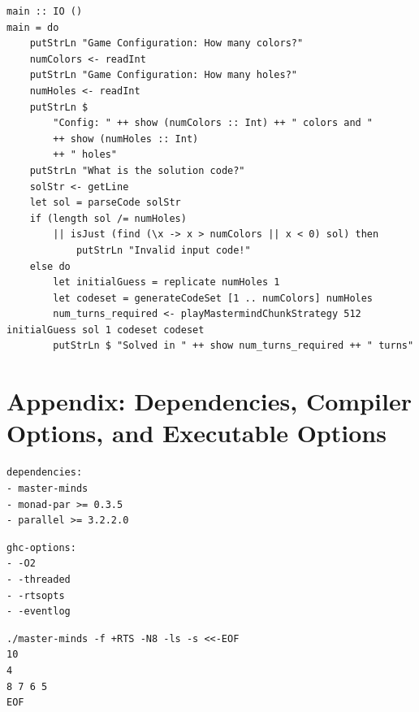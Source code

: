 \documentclass{article}
\begin{document}
\begin{verbatim}
main :: IO ()
main = do
    putStrLn "Game Configuration: How many colors?"
    numColors <- readInt
    putStrLn "Game Configuration: How many holes?"
    numHoles <- readInt
    putStrLn $
        "Config: " ++ show (numColors :: Int) ++ " colors and "
        ++ show (numHoles :: Int)
        ++ " holes"
    putStrLn "What is the solution code?"
    solStr <- getLine
    let sol = parseCode solStr
    if (length sol /= numHoles)
        || isJust (find (\x -> x > numColors || x < 0) sol) then 
            putStrLn "Invalid input code!"
    else do
        let initialGuess = replicate numHoles 1 
        let codeset = generateCodeSet [1 .. numColors] numHoles
        num_turns_required <- playMastermindChunkStrategy 512 initialGuess sol 1 codeset codeset
        putStrLn $ "Solved in " ++ show num_turns_required ++ " turns"
\end{verbatim}

\section{Appendix: Dependencies, Compiler Options, and Executable Options}
\begin{verbatim}
dependencies: 
- master-minds
- monad-par >= 0.3.5
- parallel >= 3.2.2.0
\end{verbatim}

\begin{verbatim}
ghc-options:
- -O2
- -threaded
- -rtsopts
- -eventlog
\end{verbatim}

\begin{verbatim}
./master-minds -f +RTS -N8 -ls -s <<-EOF
10
4
8 7 6 5
EOF
\end{verbatim}
\end{document}
